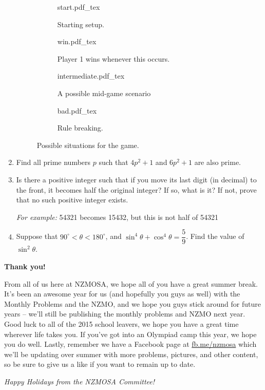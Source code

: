 \documentclass[a4paper,12pt]{article}
\begin{document}
\begin{enumerate}
    \begin{figure}[H]
        \centering
        \begin{subfigure}[t]{0.4\textwidth}
            \def\svgwidth{\textwidth}
            {start.pdf_tex}
            \caption{Starting setup.}
        \end{subfigure}
        \begin{subfigure}[t]{0.4\textwidth}
            \centering
            \def\svgwidth{\textwidth}
            {win.pdf_tex}
            \caption{Player 1 wins whenever this occurs.}
        \end{subfigure}
        \begin{subfigure}[t]{0.4\textwidth}
            \centering
            \def\svgwidth{\textwidth}
            {intermediate.pdf_tex}
            \caption{A possible mid-game scenario}
        \end{subfigure}
        \begin{subfigure}[t]{0.4\textwidth}
            \centering
            \def\svgwidth{0.65\textwidth}
            {bad.pdf_tex}
            \caption{Rule breaking.}
        \end{subfigure}
        \caption{Possible situations for the game.}
    \end{figure}

    \item
    Find all prime numbers $p$ such that $4p^2+1$ and $6p^2+1$ are also prime.
    
    \item 
    Is there a positive integer such that if you move its last digit (in decimal) to the front, it becomes half the original integer? If so, what is it? If not, prove that no such positive integer exists.
    
    \emph{For example:} 54321 becomes 15432, but this is not half of 54321
    
    \item 
    Suppose that $90^\circ < \theta < 180^\circ$, and $\sin^4 \theta + \cos^4 \theta  = \dfrac{5}{9}$. Find the value of $\sin^2 \theta$.
\end{enumerate}

\vfill
\begin{center}
\LARGE{\textbf{Thank you!}}
\end{center}
From all of us here at NZMOSA, we hope all of you have a great summer break. It's been an awesome year for us (and hopefully you guys as well) with the Monthly Problems and the NZMO, and we hope you guys stick around for future years -- we'll still be publishing the monthly problems and NZMO next year. Good luck to all of the 2015 school leavers, we hope you have a great time wherever life takes you. If you've got into an Olympiad camp this year, we hope you do well. Lastly, remember we have a Facebook page at \url{fb.me/nzmosa} which we'll be updating over summer with more problems, pictures, and other content, so be sure to give us a like if you want to remain up to date.

\textit{Happy Holidays from the NZMOSA Committee!}
\clearpage
\end{document}
